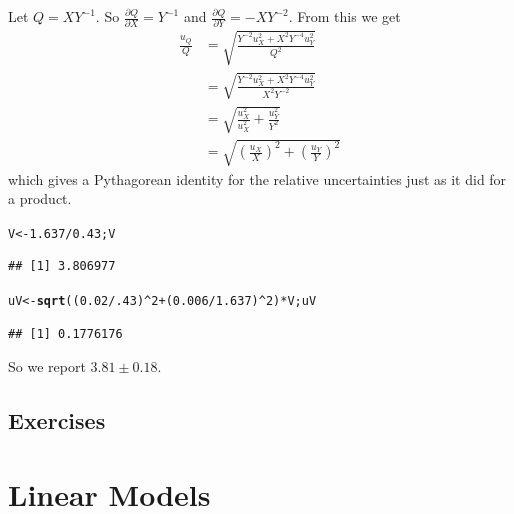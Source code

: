 \documentclass[twoside]{book}\usepackage[]{graphicx}\usepackage[]{xcolor}
\makeatletter
\newcommand{\hlnum}[1]{\textcolor[rgb]{0.686,0.059,0.569}{#1}}%
\newcommand{\hlopt}[1]{\textcolor[rgb]{0,0,0}{#1}}%
\newcommand{\hlstd}[1]{\textcolor[rgb]{0.345,0.345,0.345}{#1}}%
\newcommand{\hlkwb}[1]{\textcolor[rgb]{0.69,0.353,0.396}{#1}}%
\newcommand{\hlkwd}[1]{\textcolor[rgb]{0.737,0.353,0.396}{\textbf{#1}}}%
\newenvironment{kframe}{%
 \def\at@end@of@kframe{}%
 \ifinner\ifhmode%
  \def\at@end@of@kframe{\end{minipage}}%
  \begin{minipage}{\columnwidth}%
 \fi\fi%
 \def\FrameCommand##1{\hskip\@totalleftmargin \hskip-\fboxsep
 \colorbox{shadecolor}{##1}\hskip-\fboxsep
     \hskip-\linewidth \hskip-\@totalleftmargin \hskip\columnwidth}%
 \MakeFramed {\advance\hsize-\width
   \@totalleftmargin\z@ \linewidth\hsize
   \@setminipage}}%
 {\par\unskip\endMakeFramed%
 \at@end@of@kframe}
\newenvironment{knitrout}{}{} %
\newcommand{\Partial}[2]{\frac{\partial #1}{\partial #2}}
\newif\ifsolutions
\newif\ifsolutionslocal
\makeatother
\begin{document}
\begin{solution}
	Let $Q = X Y^{-1}$.  So 
	$\Partial{Q}{X} = Y^{-1}$ and 
	$\Partial{Q}{Y} = -X Y^{-2}$.  From this we get
\begin{align*}
\frac{u_Q}{Q} 
& = \sqrt{ \frac{ Y^{-2} u_X^2 + X^2 Y^{-4} u_Y^2}{Q^2} }
\\
& = \sqrt{ \frac{ Y^{-2} u_X^2 + X^2 Y^{-4} u_Y^2}{X^2Y^{-2}} }
\\
& = \sqrt{ \frac{ u_X^2}{u_X^2} + \frac{u_Y^2}{Y^2} }
\\
& = \sqrt{ \left(\frac{ u_X}{X}\right)^2 + \left(\frac{u_Y}{Y}\right)^2 }
\end{align*}
which gives a Pythagorean identity for the relative uncertainties just as it 
did for a product.

\begin{knitrout}
\color{fgcolor}\begin{kframe}
\begin{alltt}
\hlstd{V} \hlkwb{<-} \hlnum{1.637} \hlopt{/} \hlnum{0.43}\hlstd{; V}
\end{alltt}
\begin{verbatim}
## [1] 3.806977
\end{verbatim}
\begin{alltt}
\hlstd{uV} \hlkwb{<-} \hlkwd{sqrt}\hlstd{( (}\hlnum{0.02}\hlopt{/}\hlnum{.43}\hlstd{)}\hlopt{^}\hlnum{2} \hlopt{+} \hlstd{(}\hlnum{0.006}\hlopt{/}\hlnum{1.637}\hlstd{)}\hlopt{^}\hlnum{2} \hlstd{)} \hlopt{*} \hlstd{V; uV}
\end{alltt}
\begin{verbatim}
## [1] 0.1776176
\end{verbatim}
\end{kframe}
\end{knitrout}
So we report
$3.81 \pm 0.18$.
\end{solution}

\newpage
\section*{Exercises}
\shipoutProblems

\ifsolutions
\ifsolutionslocal
\newpage
\section*{Solutions}
\shipoutSolutions
\fi
\fi




\chapter{Linear Models}
\end{document}
